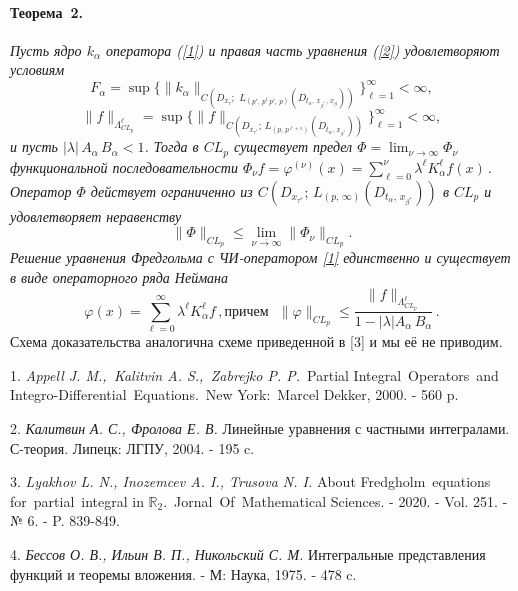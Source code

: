 \paragraph{Теорема~2.}
{\it Пусть
ядро $k_\alpha$ оператора (\ref{1}) и правая часть уравнения (\ref{2}) удовлетворяют условиям
$$F_\alpha=\sup \biggl\{\|k_{\alpha}\|_{C(D_{x_\tau};\,\, L_{(p',\,p^\ell\, p',\, p)}(D_{t_\alpha,\, x_{\beta^*}\,, x_\beta}))}\biggl\}_{\ell=1}^\infty<\infty,$$
 $$\|f\|_{\Lambda_{CL_p}^{\ell}}=\sup \biggl\{\|f\|_{C(D_{x_{\tau^*}};\,L_{(p,\,p^{\ell+1})}(D_{t_\alpha,\,x_{\beta^*}}))}\biggl\}_{\ell=1}^\infty<\infty,$$
и пусть    $|\lambda|\,A_\alpha\,B_\alpha<1$. Тогда в  $CL_p$ существует предел  $\Phi=\lim_{\nu\to\infty}\Phi_\nu$
функциональной последовательности
$
\Phi_\nu f= \varphi^{(\nu)}(x)=\sum\limits_{\ell=0}^\nu \lambda^\ell K_\alpha^\ell f(x)\,.
$
Оператор $\Phi$ действует ограниченно из $C(D_{x_{\tau^*}};\,L_{(p,\,\infty)}(D_{t_\alpha,\,x_{\beta^*}}))$ в
 $CL_p$  и удовлетворяет неравенству
$$
\|\Phi\|_{CL_p}\leq{\lim_{\overline{\nu\to\infty}}}\|\Phi_\nu\|_{CL_p}.
$$
 Решение уравнения Фредгольма  с ЧИ-оператором
\eqref{1} единственно и существует в виде операторного ряда Неймана
$$
\varphi(x)=\sum\limits_{\ell=0}^\infty \lambda^\ell K_\alpha^\ell f\,,
\text{причем}\,\,\,\,\|\varphi\|_{CL_{p}}\leq\frac{\|f\|_{\Lambda_{CL_p}^\ell}}{1-|\lambda| A_\alpha\,B_\alpha}\,.
$$}
Схема доказательства аналогична схеме приведенной в [3] и мы её не приводим.

\litlist


1. {\it Appell J. M.,\, Kalitvin A. S.,\, Zabrejko P. P.}\, Partial Integral\, Operators\, and\, Integro-Differential\, Equations.\, New York:\, Marcel Dekker, 2000. - 560 p.

2. {\it Калитвин А. С., Фролова Е. В.}
Линейные уравнения с частными интегралами. С-теория. Липецк: ЛГПУ, 2004. - 195 c.

3. {\it Lyakhov L. N., Inozemcev A. I., Trusova N. I.} About Fredgholm\, equations\, for\, partial\, integral in $\mathbb{R}_2$.\, Jornal\, Of\, Mathematical Sciences. - 2020. - Vol. 251. - № 6. - P. 839-849.

4. {\it Бессов О. В., Ильин В. П., Никольский С. М.} Интегральные представления функций и теоремы вложения. - М: Наука, 1975. - 478 c.
